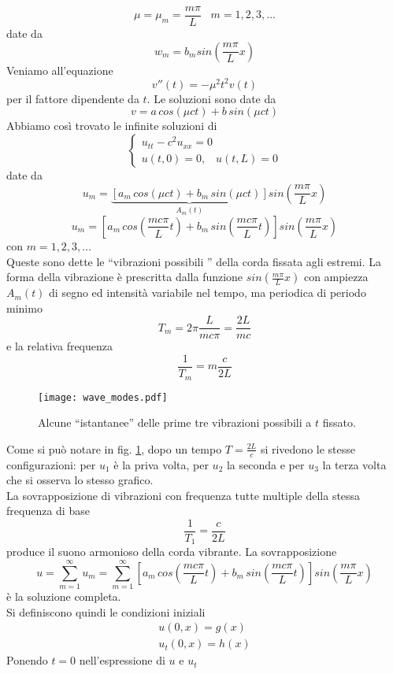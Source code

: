 \[
	\mu= \mu_m = \frac{m \pi}{L} \;\;\; m=1,2,3, \ldots
\]
date da
\[
	w_m= b_m sin \left( \frac{m\pi}{L} x \right)
\]
Veniamo all'equazione
\[
	v''(t)= -\mu^2 t^2 v(t)
\]
per il fattore dipendente da $t$.
Le soluzioni sono date da
\[
	v= a \, cos(\mu c t) + b \, sin (\mu c t)
\]
Abbiamo cos\`i trovato le infinite soluzioni di
\[
	\left\{
	\begin{array}{l}
		u_{tt} - c^2 u_{xx}= 0 \\
		u(t,0)=0, \;\;\; u(t,L)=0
	\end{array}
	\right.
\]
date da
\[
	u_m=
	\underbrace{\left[ a_m \, cos \left( \mu c t \right)
	+ b_m \, sin \left( \mu c t \right) \right]}_{A_m(t)}
	sin \left( \frac{m\pi}{L} x \right)
\]
\[
	u_m=
	\left[ a_m \, cos \left( \frac{mc\pi}{L} t \right)
	+ b_m \, sin \left( \frac{mc\pi}{L} t \right) \right]
	 sin \left( \frac{m\pi}{L} x \right)
\]
con $m=1,2,3, \ldots$\\
Queste sono dette le ``vibrazioni possibili '' della corda fissata agli estremi.
La forma della vibrazione \`e prescritta dalla funzione $sin \left(
\frac{m\pi}{L} x \right)$
con ampiezza $A_m(t)$ di segno ed intensit\`a variabile nel tempo, ma periodica
di periodo minimo
\[
	T_m= 2\pi \frac{L}{mc \pi}= \frac{2L}{mc}
\]
e la relativa frequenza
\[
	\frac{1}{T_m}= m\frac{c}{2L}
\]
\begin{figure}[t]
	\centering
	\texttt{[image: wave\_modes.pdf]}
	\caption{Alcune ``istantanee'' delle prime tre vibrazioni possibili a
$t$ fissato.}
	\label{wave_modes}
\end{figure}
\noindent
Come si pu\`o notare in fig. \ref{wave_modes}, dopo un tempo $T=\frac{2L}{c}$
si rivedono le stesse configurazioni: per $u_1$ \`e la priva volta, per $u_2$ la
seconda e per $u_3$ la terza volta che si osserva lo stesso grafico.\\
La sovrapposizione di vibrazioni con frequenza tutte multiple della stessa
frequenza di base
\[
	\frac{1}{T_1}= \frac{c}{2L}
\]
produce il suono armonioso della corda vibrante. La sovrapposizione
\[
	u= \sum_{m=1}^{\infty} u_m =
	\sum_{m=1}^{\infty} \left[ a_m \, cos \left( \frac{mc\pi}{L} t \right)
	+ b_m \, sin \left( \frac{mc\pi}{L} t \right) \right]
	 sin \left( \frac{m\pi}{L} x \right)
\]
\`e la soluzione completa.\\
Si definiscono quindi le condizioni iniziali
\[
	\begin{array}{l}
	u(0,x)= g(x)
 	\\
	u_t(0,x)= h(x)
	\end{array}
\]
Ponendo $t=0$ nell'espressione di $u$ e $u_t$
